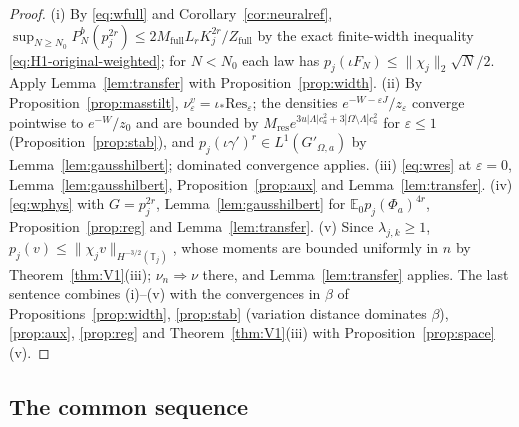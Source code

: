 \documentclass[11pt]{article}
\theoremstyle{plain}
\theoremstyle{definition}
\theoremstyle{remark}
\newcommand{\E}{\mathbb{E}}
\newcommand{\T}{\mathbb{T}}
\newcommand{\Res}{\mathrm{Res}}
\begin{document}
\begin{proof}
(i) By \eqref{eq:wfull} and Corollary~\ref{cor:neuralref},
$\sup_{N\ge N_0}P^{b}_{N}(p_j^{2r})\le2M_{\mathrm{full}}L_rK_j^{2r}/Z_{\mathrm{full}}$
by the exact finite-width inequality \eqref{eq:H1-original-weighted}; for $N<N_0$ each law has
$p_j(\iota F_N)\le\|\chi_j\|_2\sqrt N/2$. Apply Lemma~\ref{lem:transfer} with
Proposition~\ref{prop:width}. (ii) By Proposition~\ref{prop:masstilt},
$\nu^{v}_\varepsilon=\iota_*\Res_\varepsilon$; the densities $e^{-W-\varepsilon J}/z_\varepsilon$ converge pointwise to
$e^{-W}/z_0$ and are bounded by $M_{\mathrm{res}}e^{3u|\Lambda|c_a^{2}+3|\Omega\setminus\Lambda|c_a^{2}}$ for $\varepsilon\le1$
(Proposition~\ref{prop:stab}), and $p_j(\iota\gamma')^{r}\in L^{1}(G'_{\Omega,a})$ by
Lemma~\ref{lem:gausshilbert}; dominated convergence applies. (iii) \eqref{eq:wres}
at $\varepsilon=0$, Lemma~\ref{lem:gausshilbert}, Proposition~\ref{prop:aux} and
Lemma~\ref{lem:transfer}. (iv) \eqref{eq:wphys} with $G=p_j^{2r}$,
Lemma~\ref{lem:gausshilbert} for $\E_0p_j(\Phi_a)^{4r}$, Proposition~\ref{prop:reg} and
Lemma~\ref{lem:transfer}. (v) Since $\lambda_{j,k}\ge1$,
$p_j(v)\le\|\chi_jv\|_{H^{-3/2}(\T_j)}$, whose moments are bounded uniformly in $n$ by
Theorem~\ref{thm:V1}(iii); $\nu_n\Rightarrow\nu$ there, and Lemma~\ref{lem:transfer}
applies. The last sentence combines (i)--(v) with the convergences in $\beta$ of
Propositions~\ref{prop:width}, \ref{prop:stab} (variation distance dominates
$\beta$), \ref{prop:aux}, \ref{prop:reg} and Theorem~\ref{thm:V1}(iii) with
Proposition~\ref{prop:space}(v).
\end{proof}

\subsection{The common sequence}
\end{document}
